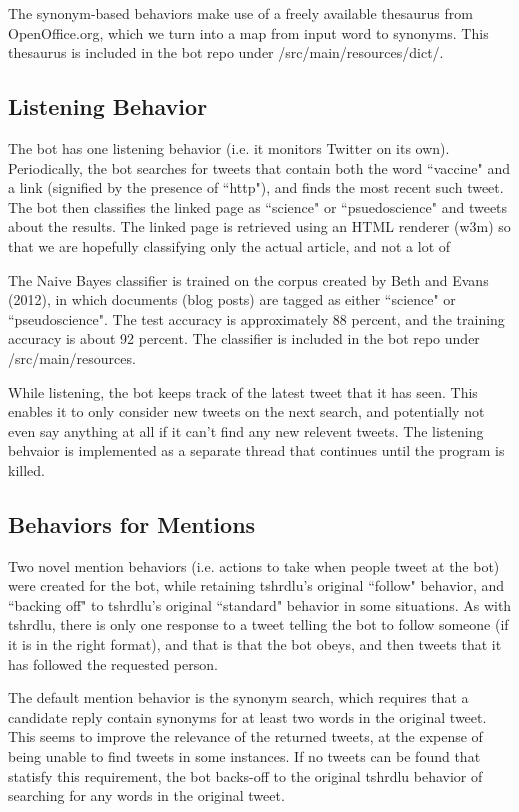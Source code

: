 \documentclass[11pt]{article}
\begin{document}
The synonym-based behaviors make use of a freely available thesaurus from OpenOffice.org, which we turn into a map from input word to synonyms. This thesaurus is included in the bot repo under /src/main/resources/dict/.

\subsection{Listening Behavior}

The bot has one listening behavior (i.e. it monitors Twitter on its own). Periodically, the bot searches for tweets that contain both the word ``vaccine" and a link (signified by the presence of ``http"), and finds the most recent such tweet. The bot then classifies the linked page as ``science" or ``psuedoscience" and tweets about the results. The linked page is retrieved using an HTML renderer (w3m) so that we are hopefully classifying only the actual article, and not a lot of 

The Naive Bayes classifier is trained on the corpus created by Beth and Evans (2012), in which documents (blog posts) are tagged as either ``science" or ``pseudoscience". The test accuracy is approximately 88 percent, and the training accuracy is about 92 percent. The classifier is included in the bot repo under /src/main/resources.

While listening, the bot keeps track of the latest tweet that it has seen. This enables it to only consider new tweets on the next search, and potentially not even say anything at all if it can't find any new relevent tweets. The listening behvaior is implemented as a separate thread that continues until the program is killed.

\subsection{Behaviors for Mentions}

Two novel mention behaviors (i.e. actions to take when people tweet at the bot) were created for the bot, while retaining tshrdlu's original ``follow" behavior, and ``backing off" to tshrdlu's original ``standard" behavior in some situations. As with tshrdlu, there is only one response to a tweet telling the bot to follow someone (if it is in the right format), and that is that the bot obeys, and then tweets that it has followed the requested person.

The default mention behavior is the synonym search, which requires that a candidate reply contain synonyms for at least two words in the original tweet. This seems to improve the relevance of the returned tweets, at the expense of being unable to find tweets in some instances. If no tweets can be found that statisfy this requirement, the bot backs-off to the original tshrdlu behavior of searching for any words in the original tweet.
\end{document}
